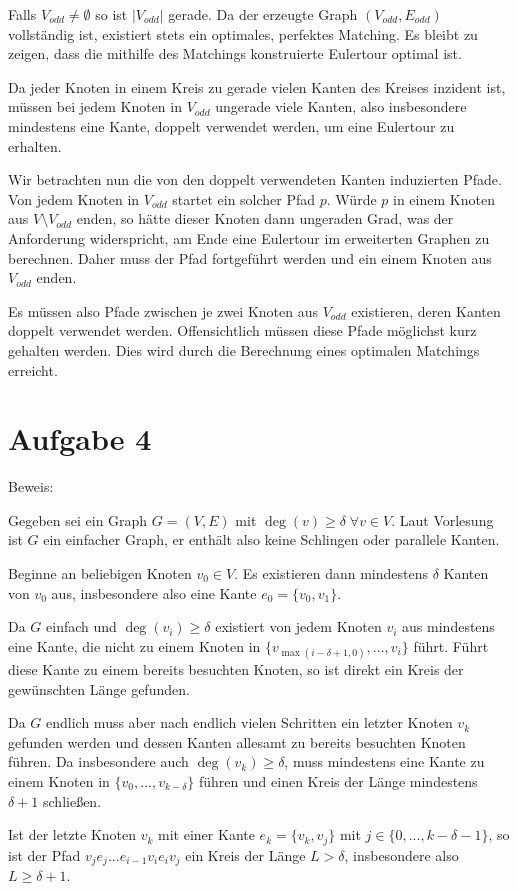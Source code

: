 \documentclass[a4paper]{article}
\begin{document}
Falls $V_{odd} \neq \emptyset$ so ist $| V_{odd} |$ gerade. Da der erzeugte
Graph $(V_{odd}, E_{odd})$ vollständig ist, existiert stets ein optimales,
perfektes Matching. Es bleibt zu zeigen, dass die mithilfe des Matchings
konstruierte Eulertour optimal ist.

Da jeder Knoten in einem Kreis zu gerade vielen Kanten des Kreises
inzident ist, müssen bei jedem Knoten in $V_{odd}$ ungerade viele Kanten, also
insbesondere mindestens eine Kante, doppelt verwendet werden, um eine Eulertour
zu erhalten.

Wir betrachten nun die von den doppelt verwendeten Kanten induzierten Pfade.
Von jedem Knoten in $V_{odd}$ startet ein solcher Pfad $p$. Würde $p$ in
einem Knoten aus $V \setminus V_{odd}$ enden, so hätte dieser Knoten
dann ungeraden Grad, was der Anforderung widerspricht, am Ende eine
Eulertour im erweiterten Graphen zu berechnen. Daher muss der Pfad fortgeführt werden und ein einem
Knoten aus $V_{odd}$ enden. 

Es müssen also Pfade zwischen je zwei Knoten aus $V_{odd}$ existieren, deren
Kanten doppelt verwendet werden. Offensichtlich müssen diese Pfade möglichst
kurz gehalten werden. Dies wird durch die Berechnung eines optimalen
Matchings erreicht.

\section{Aufgabe 4}

Beweis:

Gegeben sei ein Graph $G = (V, E)$ mit $\deg(v) \geq \delta \; \forall v \in V$.
Laut Vorlesung ist $G$ ein einfacher Graph, er enthält also keine Schlingen
oder parallele Kanten.

Beginne an beliebigen Knoten $v_0 \in V$. Es existieren dann mindestens
$\delta$ Kanten von $v_0$ aus, insbesondere also eine Kante $e_0 = \{v_0,
v_1\}$.

Da $G$ einfach und $\deg(v_i) \geq \delta$ existiert von jedem Knoten $v_i$
aus mindestens eine Kante, die nicht zu einem Knoten in $\{
v_{\max(i-\delta+1, 0)}, ..., v_i\}$ führt. Führt diese Kante zu einem
bereits besuchten Knoten, so ist direkt ein Kreis der gewünschten Länge
gefunden.

Da $G$ endlich muss aber nach endlich vielen Schritten ein letzter Knoten $v_k$
gefunden werden und dessen Kanten allesamt zu bereits besuchten Knoten führen.
Da insbesondere auch $\deg(v_k) \geq \delta$, muss mindestens eine Kante zu
einem Knoten in $\{ v_0, ..., v_{k-\delta}\}$ führen und einen Kreis der
Länge mindestens $\delta + 1$ schließen.

Ist der letzte Knoten $v_k$ mit einer Kante $e_k = \{v_k, v_j\}$ mit $j \in
\{0, ..., k-\delta-1\}$, so ist der Pfad $v_j e_j ... e_{i-1} v_i e_i v_j$ ein Kreis der Länge $L > \delta$, insbesondere
also $L \geq \delta + 1$.
\end{document}
